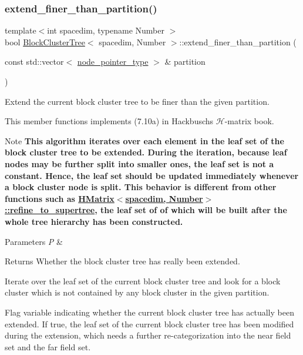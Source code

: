 \subsubsection{\texorpdfstring{extend\+\_\+finer\+\_\+than\+\_\+partition()}{extend\_finer\_than\_partition()}}
{\footnotesize\ttfamily template$<$int spacedim, typename Number $>$ \\
bool \hyperlink{classBlockClusterTree}{Block\+Cluster\+Tree}$<$ spacedim, Number $>$\+::extend\+\_\+finer\+\_\+than\+\_\+partition (\begin{DoxyParamCaption}\item[{const std\+::vector$<$ \hyperlink{classTreeNode}{node\+\_\+pointer\+\_\+type} $>$ \&}]{partition }\end{DoxyParamCaption})}

Extend the current block cluster tree to be finer than the given partition.

This member functions implements (7.\+10a) in Hackbusch\textquotesingle{}s $\mathcal{H}$-\/matrix book.


\begin{DoxyDescription}
\item[Note ]{\bfseries This algorithm iterates over each element in the leaf set of the block cluster tree to be extended. During the iteration, because leaf nodes may be further split into smaller ones, the leaf set is not a constant. Hence, the leaf set should be updated immediately whenever a block cluster node is split. This behavior is different from other functions such as {\ttfamily \hyperlink{classHMatrix_ad2b353962226c78910d6ddb6b5b8e460}{H\+Matrix$<$spacedim, Number$>$\+::refine\+\_\+to\+\_\+supertree}}, the leaf set of of which will be built after the whole tree hierarchy has been constructed.}  
\end{DoxyDescription}
\begin{DoxyParams}{Parameters}
{\em P} & \\
\hline
\end{DoxyParams}
\begin{DoxyReturn}{Returns}
Whether the block cluster tree has really been extended. 
\end{DoxyReturn}
Iterate over the leaf set of the current block cluster tree and look for a block cluster which is not contained by any block cluster in the given partition.

Flag variable indicating whether the current block cluster tree has actually been extended. If true, the leaf set of the current block cluster tree has been modified during the extension, which needs a further re-\/categorization into the near field set and the far field set.

